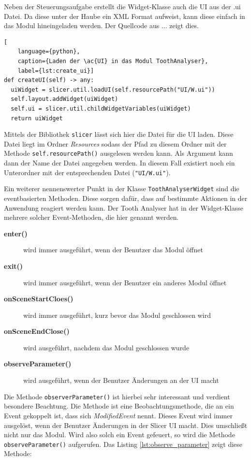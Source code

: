 Neben der Steuerungsaufgabe erstellt die Widget-Klasse auch die UI aus der .ui
Datei. Da diese unter der Haube ein XML Format aufweist, kann diese einfach in
das Modul hineingeladen werden. Der Quellcode aus ... zeigt dies.

\begin{lstlisting}[
    language={python},
    caption={Laden der \ac{UI} in das Modul ToothAnalyser},
    label={lst:create_ui}]
def createUI(self) -> any:
  uiWidget = slicer.util.loadUI(self.resourcePath("UI/W.ui"))
  self.layout.addWidget(uiWidget)
  self.ui = slicer.util.childWidgetVariables(uiWidget)
  return uiWidget
\end{lstlisting}

Mittels der Bibliothek \texttt{slicer} lässt sich hier die Datei für die \ac{UI}
laden. Diese Datei liegt im Ordner \textit{Resources} sodass der Pfad zu diesem
Ordner mit der Methode \texttt{self.resourcePath()} ausgelesen werden kann. Als
Argument kann dann der Name der Datei angegeben werden. In diesem Fall existiert
noch ein Unterordner mit der entsprechenden Datei (\texttt{"UI/W.ui"}).

Ein weiterer nennenswerter Punkt in der Klasse \texttt{ToothAnalyserWidget} sind
die eventbasierten Methoden. Diese sorgen dafür, dass auf bestimmte Aktionen in der
Anwendung reagiert werden kann. Der Tooth Analyser hat in der Widget-Klasse
mehrere solcher Event-Methoden, die hier genannt werden.

\begin{description}
	\item[\textbf{enter()}] wird immer ausgeführt, wenn der Benutzer das Modul
		öffnet

	\item[\textbf{exit()}] wird immer ausgeführt, wenn der Benutzer ein anderes
		Modul öffnet

	\item[\textbf{onSceneStartCloes()}] wird immer ausgeführt, kurz bevor das
		Modul geschlossen wird

	\item[\textbf{onSceneEndClose()}] wird ausgeführt, nachdem das Modul
		geschlossen wurde

	\item[\textbf{observeParameter()}] wird ausgeführt, wenn der Benutzer
		Änderungen an der \ac{UI} macht
\end{description}

Die Methode \texttt{observerParameter()} ist hierbei sehr interessant und verdient
besondere Beachtung. Die Methode ist eine Beobachtungsmethode, die an ein Event gekoppelt
ist, dass sich \textit{ModifiedEvent} nennt. Dieses Event wird immer ausgelöst, wenn
der Benutzer Änderungen in der Slicer \ac{UI} macht. Dies umschließt nicht nur das
Modul. Wird also solch ein Event gefeuert, so wird die Methode \texttt{observeParameter()}
aufgerufen. Das Listing \ref{lst:observe_parameter} zeigt diese Methode:

